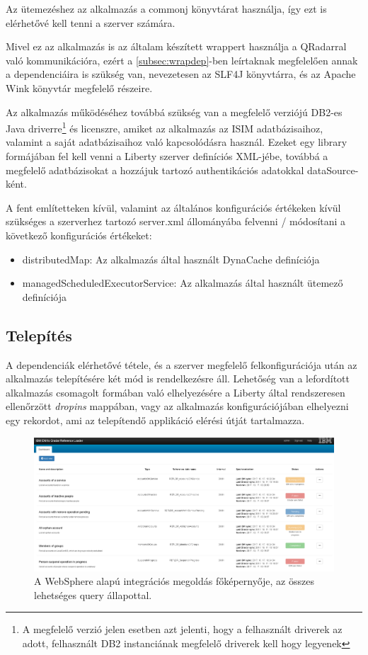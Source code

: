 Az ütemezéshez az alkalmazás a commonj \cite{commonj} könyvtárat használja, így ezt is elérhetővé kell tenni a szerver számára. 

Mivel ez az alkalmazás is az általam készített wrappert használja a QRadarral való kommunikációra, ezért a \ref{subsec:wrapdep}-ben leírtaknak megfelelően annak a dependenciáira is szükség van, nevezetesen az SLF4J könyvtárra, és az Apache Wink könyvtár megfelelő részeire.

Az alkalmazás működéséhez továbbá szükség van a megfelelő verziójú DB2-es Java driverre\footnote{A megfelelő verzió jelen esetben azt jelenti, hogy a felhasznált driverek az adott, felhasznált DB2 instanciának megfelelő driverek kell hogy legyenek} és licenszre, amiket az alkalmazás az ISIM adatbázisaihoz, valamint a saját adatbázisaihoz való kapcsolódásra használ. Ezeket egy library formájában fel kell venni a Liberty szerver definíciós XML-jébe, továbbá a megfelelő adatbázisokat a hozzájuk tartozó authentikációs adatokkal dataSource-ként.\cite{wsdatasource}

A fent említetteken kívül, valamint az általános konfigurációs értékeken kívül szükséges a szerverhez tartozó server.xml állományába felvenni / módosítani a következő konfigurációs értékeket:
\begin{itemize}
	\item distributedMap\cite{dynacache}: Az alkalmazás által használt DynaCache definíciója 
	\item managedScheduledExecutorService\cite{wsscheduler}: Az alkalmazás által használt ütemező definíciója
\end{itemize}

\subsection{Telepítés}
A dependenciák elérhetővé tétele, és a szerver megfelelő felkonfigurációja után az alkalmazás telepítésére két mód is rendelkezésre áll. Lehetőség van a lefordított alkalmazás csomagolt formában való elhelyezésére a Liberty által rendszeresen ellenőrzött \textit{dropins} mappában, vagy az alkalmazás konfigurációjában elhelyezni egy rekordot, ami az telepítendő applikáció elérési útját tartalmazza. \cite{wsdropin}

\begin{figure}[!h]
	\centering
	\includegraphics[width=0.8\linewidth]{figures/refloader_ui/all_states}
	\caption{A WebSphere alapú integrációs megoldás főképernyője, az összes lehetséges query állapottal.}
	\label{fig:allstates}
\end{figure}

